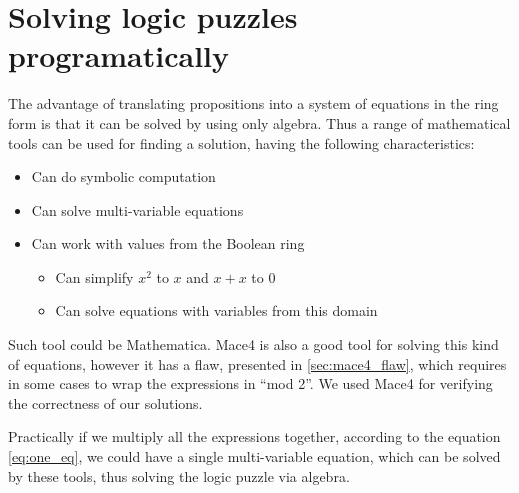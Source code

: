 \section{Solving logic puzzles programatically}
\label{sec:solve}

The advantage of translating propositions into a system of equations in the ring form is that it can be solved by using only algebra. Thus a range of mathematical tools can be used for finding a solution, having the following characteristics:

\begin{itemize}
\item Can do symbolic computation
\item Can solve multi-variable equations
\item Can work with values from the Boolean ring
\begin{itemize}
 \item Can simplify $x^2$ to $x$ and $x + x$ to $0$
 \item Can solve equations with variables from this domain
\end{itemize}

\end{itemize}

Such tool could be Mathematica. Mace4 is also a good tool for solving this kind of equations, however it has a flaw, presented in \ref{sec:mace4_flaw}, which requires in some cases to wrap the expressions in ``mod 2''. We used Mace4 for verifying the correctness of our solutions.

Practically if we multiply all the expressions together, according to the equation \ref{eq:one_eq}, we could have a single multi-variable equation, which can be solved by these tools, thus solving the logic puzzle via algebra.
